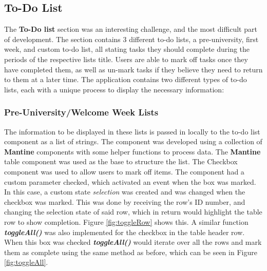 \documentclass{l4proj}
\begin{document}
\subsection{To-Do List}
The \textbf{To-Do list} section was an interesting challenge,  and the most difficult part of development. The section contains 3 different to-do lists,  a pre-university,  first week,  and custom to-do list,  all stating tasks they should complete during the periods of the respective lists title. Users are able to mark off tasks once they have completed them,  as well as un-mark tasks if they believe they need to return to them at a later time. The application contains two different types of to-do lists,  each with a unique process to display the necessary information:

\subsubsection{Pre-University/Welcome Week Lists}
The information to be displayed in these lists is passed in locally to the to-do list component as a list of strings. The component was developed using a collection of \textbf{Mantine} components with some helper functions to process data. The \textbf{Mantine} table component was used as the base to structure the list. The Checkbox component was used to allow users to mark off items. The component had a custom parameter checked,  which activated an event when the box was marked. In this case,  a custom state \textit{selection} was created and was changed when the checkbox was marked. This was done by receiving the row's ID number,  and changing the selection state of said row,  which in return would highlight the table row to show completion. Figure \ref{fig:toggleRow} shows this. A similar function \textit{\textbf{toggleAll()}} was also implemented for the checkbox in the table header row. When this box was checked \textit{\textbf{toggleAll()}} would iterate over all the rows and mark them as complete using the same method as before,  which can be seen in Figure \ref{fig:toggleAll}.
\end{document}
